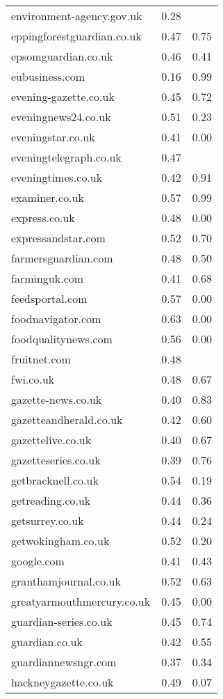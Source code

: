 \begin{longtable}{p{}p{}p{}}
  environment-agency.gov.uk & 0.28 &  \\ 
  eppingforestguardian.co.uk & 0.47 & 0.75 \\ 
  epsomguardian.co.uk & 0.46 & 0.41 \\ 
  eubusiness.com & 0.16 & 0.99 \\ 
  evening-gazette.co.uk & 0.45 & 0.72 \\ 
  eveningnews24.co.uk & 0.51 & 0.23 \\ 
  eveningstar.co.uk & 0.41 & 0.00 \\ 
  eveningtelegraph.co.uk & 0.47 &  \\ 
  eveningtimes.co.uk & 0.42 & 0.91 \\ 
  examiner.co.uk & 0.57 & 0.99 \\ 
  express.co.uk & 0.48 & 0.00 \\ 
  expressandstar.com & 0.52 & 0.70 \\ 
  farmersguardian.com & 0.48 & 0.50 \\ 
  farminguk.com & 0.41 & 0.68 \\ 
  feedsportal.com & 0.57 & 0.00 \\ 
  foodnavigator.com & 0.63 & 0.00 \\ 
  foodqualitynews.com & 0.56 & 0.00 \\ 
  fruitnet.com & 0.48 &  \\ 
  fwi.co.uk & 0.48 & 0.67 \\ 
  gazette-news.co.uk & 0.40 & 0.83 \\ 
  gazetteandherald.co.uk & 0.42 & 0.60 \\ 
  gazettelive.co.uk & 0.40 & 0.67 \\ 
  gazetteseries.co.uk & 0.39 & 0.76 \\ 
  getbracknell.co.uk & 0.54 & 0.19 \\ 
  getreading.co.uk & 0.44 & 0.36 \\ 
  getsurrey.co.uk & 0.44 & 0.24 \\ 
  getwokingham.co.uk & 0.52 & 0.20 \\ 
  google.com & 0.41 & 0.43 \\ 
  granthamjournal.co.uk & 0.52 & 0.63 \\ 
  greatyarmouthmercury.co.uk & 0.45 & 0.00 \\ 
  guardian-series.co.uk & 0.45 & 0.74 \\ 
  guardian.co.uk & 0.42 & 0.55 \\ 
  guardiannewsngr.com & 0.37 & 0.34 \\ 
  hackneygazette.co.uk & 0.49 & 0.07 \\ 

\end{longtable}
